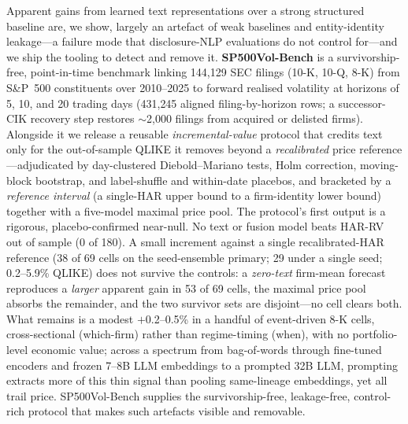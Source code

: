 Apparent gains from learned text representations over a strong structured baseline are, we show, largely an artefact of weak baselines and entity-identity leakage---a failure mode that disclosure-NLP evaluations do not control for---and we ship the tooling to detect and remove it. \textbf{SP500Vol-Bench} is a survivorship-free, point-in-time benchmark linking 144{,}129 SEC filings (10-K, 10-Q, 8-K) from S\&P~500 constituents over 2010--2025 to forward realised volatility at horizons of 5, 10, and 20 trading days (431{,}245 aligned filing-by-horizon rows; a successor-CIK recovery step restores $\sim$2{,}000 filings from acquired or delisted firms). Alongside it we release a reusable \emph{incremental-value} protocol that credits text only for the out-of-sample QLIKE it removes beyond a \emph{recalibrated} price reference---adjudicated by day-clustered Diebold--Mariano tests, Holm correction, moving-block bootstrap, and label-shuffle and within-date placebos, and bracketed by a \emph{reference interval} (a single-HAR upper bound to a firm-identity lower bound) together with a five-model maximal price pool. The protocol's first output is a rigorous, placebo-confirmed near-null. No text or fusion model beats HAR-RV out of sample (0 of 180). A small increment against a single recalibrated-HAR reference (38 of 69 cells on the seed-ensemble primary; 29 under a single seed; 0.2--5.9\% QLIKE) does not survive the controls: a \emph{zero-text} firm-mean forecast reproduces a \emph{larger} apparent gain in 53 of 69 cells, the maximal price pool absorbs the remainder, and the two survivor sets are disjoint---no cell clears both. What remains is a modest $+$0.2--0.5\% in a handful of event-driven 8-K cells, cross-sectional (which-firm) rather than regime-timing (when), with no portfolio-level economic value; across a spectrum from bag-of-words through fine-tuned encoders and frozen 7--8B LLM embeddings to a prompted 32B LLM, prompting extracts more of this thin signal than pooling same-lineage embeddings, yet all trail price. SP500Vol-Bench supplies the survivorship-free, leakage-free, control-rich protocol that makes such artefacts visible and removable.
